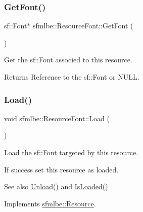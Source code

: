 \subsubsection{\texorpdfstring{Get\+Font()}{GetFont()}}
{\footnotesize\ttfamily sf\+::\+Font$\ast$ sfmlbe\+::\+Resource\+Font\+::\+Get\+Font (\begin{DoxyParamCaption}{ }\end{DoxyParamCaption})\hspace{0.3cm}{\ttfamily [inline]}}



Get the sf\+::\+Font associed to this resource. 

\begin{DoxyReturn}{Returns}
Reference to the sf\+::\+Font or N\+U\+LL. 
\end{DoxyReturn}
\mbox{\label{classsfmlbe_1_1_resource_font_a8629842a4597fa4c22e58a85ae76bc74}} 
\subsubsection{\texorpdfstring{Load()}{Load()}}
{\footnotesize\ttfamily void sfmlbe\+::\+Resource\+Font\+::\+Load (\begin{DoxyParamCaption}{ }\end{DoxyParamCaption})\hspace{0.3cm}{\ttfamily [virtual]}}



Load the sf\+::\+Font targeted by this resource. 

If success set this resource as loaded. \begin{DoxySeeAlso}{See also}
\mbox{\hyperlink{classsfmlbe_1_1_resource_font_a44911079325cd8fcf3f2bce64c58ff86}{Unload()}} and \mbox{\hyperlink{classsfmlbe_1_1_resource_acd0812c81f7d5d851a4671f0cf7bb4f1}{Is\+Loaded()}} 
\end{DoxySeeAlso}


Implements \mbox{\hyperlink{classsfmlbe_1_1_resource_a35981869a1e90ebbf30258ff7aa1d6d2}{sfmlbe\+::\+Resource}}.

\mbox{\label{classsfmlbe_1_1_resource_font_a44911079325cd8fcf3f2bce64c58ff86}} 
